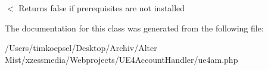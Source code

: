 $<$ Returns false if prerequisites are not installed 

The documentation for this class was generated from the following file\-:\begin{DoxyCompactItemize}
\item 
/\-Users/timkoepsel/\-Desktop/\-Archiv/\-Alter Mist/xzessmedia/\-Webprojects/\-U\-E4\-Account\-Handler/ue4am.\-php\end{DoxyCompactItemize}
